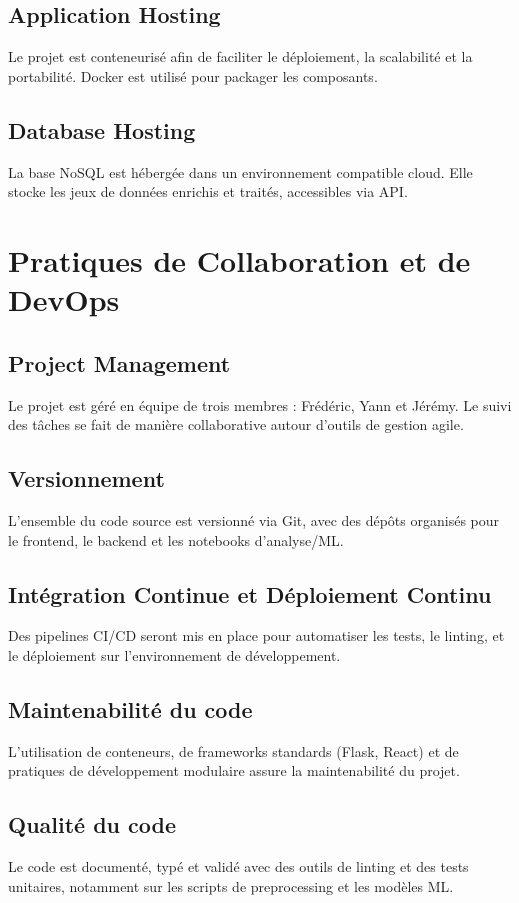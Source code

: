 \documentclass[12pt]{report}
\begin{document}
\section{Application Hosting}
Le projet est conteneurisé afin de faciliter le déploiement, la scalabilité et la portabilité. Docker est utilisé pour packager les composants.

\section{Database Hosting}
La base NoSQL est hébergée dans un environnement compatible cloud. Elle stocke les jeux de données enrichis et traités, accessibles via API.

\chapter{Pratiques de Collaboration et de DevOps}
\section{Project Management}
Le projet est géré en équipe de trois membres : Frédéric, Yann et Jérémy. Le suivi des tâches se fait de manière collaborative autour d'outils de gestion agile.

\section{Versionnement}
L’ensemble du code source est versionné via Git, avec des dépôts organisés pour le frontend, le backend et les notebooks d'analyse/ML.

\section{Intégration Continue et Déploiement Continu}
Des pipelines CI/CD seront mis en place pour automatiser les tests, le linting, et le déploiement sur l’environnement de développement.

\section{Maintenabilité du code}
L'utilisation de conteneurs, de frameworks standards (Flask, React) et de pratiques de développement modulaire assure la maintenabilité du projet.

\section{Qualité du code}
Le code est documenté, typé et validé avec des outils de linting et des tests unitaires, notamment sur les scripts de preprocessing et les modèles ML.
\end{document}
